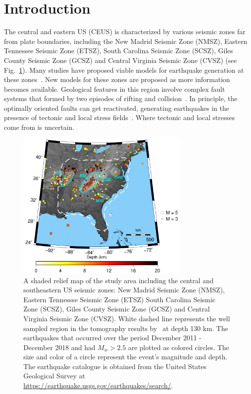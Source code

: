 \documentclass[draft,linenumbers]{agujournal2018}
\begin{document}
\section{Introduction}
    The central and eastern US (CEUS) is characterized by various seismic zones far from plate boundaries, including the New Madrid Seismic Zone (NMSZ), Eastern Tennessee Seismic Zone (ETSZ), South Carolina Seismic Zone (SCSZ), Giles County Seismic Zone (GCSZ) and Central Virginia Seismic Zone (CVSZ) (see Fig.~\ref{figone}). Many studies have proposed viable models for earthquake generation at these zones~\citep[e.g.,][]{Liu_1997, Kenner_2000a, Grollimund_2001, Pollitz_2001}. New models for these zones are proposed as more information becomes available. Geological features in this region involve complex fault systems that formed by two episodes of rifting and collision~\citep[e.g.,][]{keller1983role, hoffman1989precambrian, thomas2006tectonic}. In principle, the optimally oriented faults can get reactivated, generating earthquakes in the presence of tectonic and local stress fields~\citep[e.g.,][]{zoback1992stress, hurd2012intraplate}. Where tectonic and local stresses come from is uncertain.
\begin{figure}[ht]
    \centering
    \includegraphics[width=20pc]{figures/seismicity_new.png}
    \caption{ A shaded relief map of the study area including the central and southeastern US seismic zones: New Madrid Seismic Zone (NMSZ), Eastern Tennessse Seismic Zone (ETSZ) South Carolina Seismic Zone (SCSZ), Giles County Seismic Zone (GCSZ) and Central Virginia Seismic Zone (CVSZ). White dashed line represents the well sampled region in the tomography results by~\citet{Biryol_2016} at depth 130 km. The earthquakes that occurred over the period December 2011 - December 2018 and had $M_{w} > 2.5$ are plotted as colored circles. The size and color of a circle represent the event's magnitude and depth. The earthquake catalogue is obtained from the United States Geological Survey at \url{https://earthquake.usgs.gov/earthquakes/search/}.}
    \label{figone}
 \end{figure}
\end{document}

